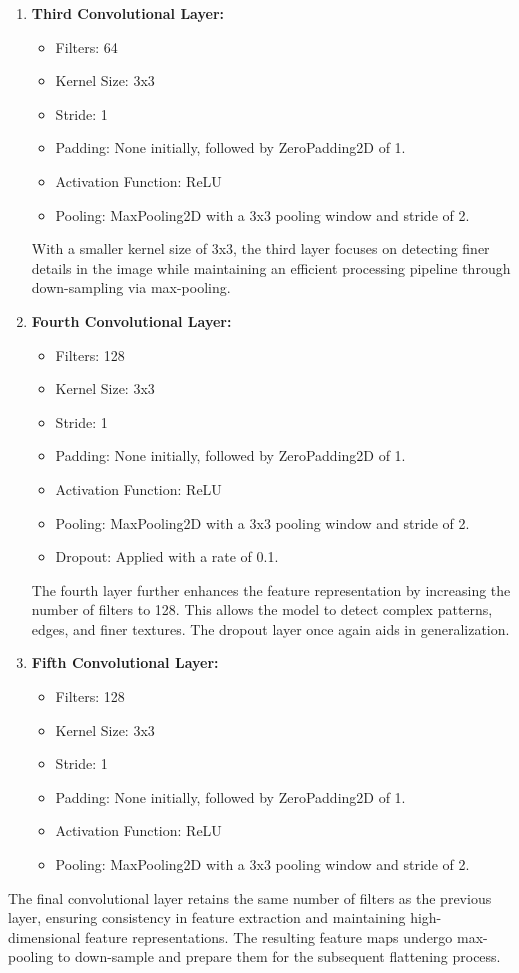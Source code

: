 \begin{enumerate}[label=\textbf{\roman*})]
    \item \textbf{Third Convolutional Layer:}
    \begin{itemize}
        \item Filters: 64
        \item Kernel Size: 3x3
        \item Stride: 1
        \item Padding: None initially, followed by ZeroPadding2D of 1.
        \item Activation Function: ReLU
        \item Pooling: MaxPooling2D with a 3x3 pooling window and stride of 2.
    \end{itemize}
    With a smaller kernel size of 3x3, the third layer focuses on detecting finer details in the image while maintaining an efficient processing pipeline through down-sampling via max-pooling.

    \item \textbf{Fourth Convolutional Layer:}
    \begin{itemize}
        \item Filters: 128
        \item Kernel Size: 3x3
        \item Stride: 1
        \item Padding: None initially, followed by ZeroPadding2D of 1.
        \item Activation Function: ReLU
        \item Pooling: MaxPooling2D with a 3x3 pooling window and stride of 2.
        \item Dropout: Applied with a rate of 0.1.
    \end{itemize}
    The fourth layer further enhances the feature representation by increasing the number of filters to 128. This allows the model to detect complex patterns, edges, and finer textures. The dropout layer once again aids in generalization.

    \item \textbf{Fifth Convolutional Layer:}
    \begin{itemize}
        \item Filters: 128
        \item Kernel Size: 3x3
        \item Stride: 1
        \item Padding: None initially, followed by ZeroPadding2D of 1.
        \item Activation Function: ReLU
        \item Pooling: MaxPooling2D with a 3x3 pooling window and stride of 2.
    \end{itemize}
\end{enumerate}
    The final convolutional layer retains the same number of filters as the previous layer, ensuring consistency in feature extraction and maintaining high-dimensional feature representations. The resulting feature maps undergo max-pooling to down-sample and prepare them for the subsequent flattening process.

